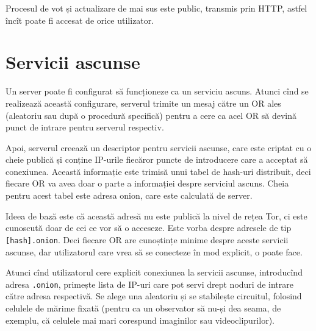 Procesul de vot și actualizare de mai sus este public, transmis prin HTTP, astfel
încît poate fi accesat de orice utilizator.



\section{Servicii ascunse}

\indent\indent Un server poate fi configurat să funcționeze ca un serviciu
ascuns. Atunci cînd se realizează această configurare, serverul trimite
un mesaj către un OR ales (aleatoriu sau după o procedură specifică) pentru
a cere ca acel OR să devină punct de intrare pentru serverul respectiv.

Apoi, serverul creează un descriptor pentru servicii ascunse, care este
criptat cu o cheie publică și conține IP-urile fiecăror puncte de introducere
care a acceptat să conexiunea. Această informație este trimisă unui tabel
de hash-uri distribuit, deci fiecare OR va avea doar o parte a informației
despre serviciul ascuns. Cheia pentru acest tabel este adresa onion, care
este calculată de server.

Ideea de bază este că această adresă nu este publică la nivel de rețea Tor,
ci este cunoscută doar de cei ce vor să o acceseze. Este vorba despre
adresele de tip \texttt{[hash].onion}. Deci fiecare OR are cunoștințe minime
despre aceste servicii ascunse, dar utilizatorul care vrea să se conecteze
în mod explicit, o poate face.

Atunci cînd utilizatorul cere explicit conexiunea la servicii ascunse,
introducînd a\-dre\-sa \texttt{.onion}, primește lista de IP-uri care pot servi
drept noduri de intrare către adresa respectivă. Se alege una aleatoriu
și se stabilește circuitul, folosind celulele de mărime fixată (pentru ca
un observator să nu-și dea seama, de exemplu, că celulele mai mari corespund
imaginilor sau videoclipurilor).

